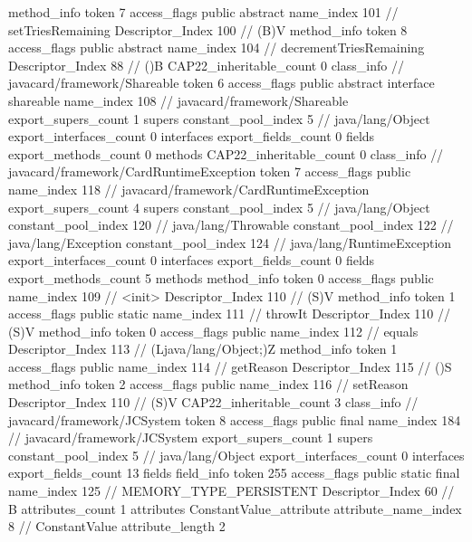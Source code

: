 {{{{{				}
				method_info {
					token	7
					access_flags	public abstract
					name_index	101		// setTriesRemaining
					Descriptor_Index	100		// (B)V
				}
				method_info {
					token	8
					access_flags	public abstract
					name_index	104		// decrementTriesRemaining
					Descriptor_Index	88		// ()B
				}
			}
			CAP22_inheritable_count	0
		}
		class_info {		// javacard/framework/Shareable
			token	6
			access_flags	public abstract interface shareable
			name_index	108		// javacard/framework/Shareable
			export_supers_count	1
			supers {
				constant_pool_index	5		// java/lang/Object
			}
			export_interfaces_count	0
			interfaces {
			}
			export_fields_count	0
			fields {
			}
			export_methods_count	0
			methods {
			}
			CAP22_inheritable_count	0
		}
		class_info {		// javacard/framework/CardRuntimeException
			token	7
			access_flags	public
			name_index	118		// javacard/framework/CardRuntimeException
			export_supers_count	4
			supers {
				constant_pool_index	5		// java/lang/Object
				constant_pool_index	120		// java/lang/Throwable
				constant_pool_index	122		// java/lang/Exception
				constant_pool_index	124		// java/lang/RuntimeException
			}
			export_interfaces_count	0
			interfaces {
			}
			export_fields_count	0
			fields {
			}
			export_methods_count	5
			methods {
				method_info {
					token	0
					access_flags	public
					name_index	109		// <init>
					Descriptor_Index	110		// (S)V
				}
				method_info {
					token	1
					access_flags	public static
					name_index	111		// throwIt
					Descriptor_Index	110		// (S)V
				}
				method_info {
					token	0
					access_flags	public
					name_index	112		// equals
					Descriptor_Index	113		// (Ljava/lang/Object;)Z
				}
				method_info {
					token	1
					access_flags	public
					name_index	114		// getReason
					Descriptor_Index	115		// ()S
				}
				method_info {
					token	2
					access_flags	public
					name_index	116		// setReason
					Descriptor_Index	110		// (S)V
				}
			}
			CAP22_inheritable_count	3
		}
		class_info {		// javacard/framework/JCSystem
			token	8
			access_flags	public final
			name_index	184		// javacard/framework/JCSystem
			export_supers_count	1
			supers {
				constant_pool_index	5		// java/lang/Object
			}
			export_interfaces_count	0
			interfaces {
			}
			export_fields_count	13
			fields {
			field_info {
				token	255
				access_flags	public static final
				name_index	125		// MEMORY_TYPE_PERSISTENT
				Descriptor_Index	60		// B
				attributes_count	1
				attributes {
				ConstantValue_attribute {
					attribute_name_index	8		// ConstantValue
					attribute_length	2
}}}}}}}
